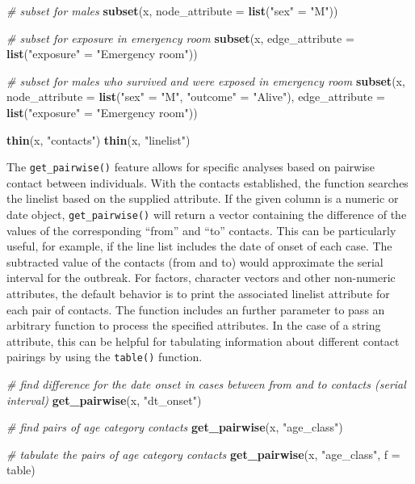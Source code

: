 \documentclass[9pt,a4paper,]{extarticle}
\newenvironment{Shaded}{\begin{snugshade}}{\end{snugshade}}
\newcommand{\KeywordTok}[1]{\textcolor[rgb]{0.13,0.29,0.53}{\textbf{#1}}}
\newcommand{\DataTypeTok}[1]{\textcolor[rgb]{0.13,0.29,0.53}{#1}}
\newcommand{\StringTok}[1]{\textcolor[rgb]{0.31,0.60,0.02}{#1}}
\newcommand{\CommentTok}[1]{\textcolor[rgb]{0.56,0.35,0.01}{\textit{#1}}}
\newcommand{\NormalTok}[1]{#1}
\theoremstyle{definition}
\theoremstyle{definition}
\theoremstyle{definition}
\theoremstyle{remark}
\begin{document}
\begin{Shaded}
\begin{Highlighting}[]
\CommentTok{# subset for males}
\KeywordTok{subset}\NormalTok{(x, }\DataTypeTok{node_attribute =} \KeywordTok{list}\NormalTok{(}\StringTok{"sex"}\NormalTok{ =}\StringTok{ "M"}\NormalTok{))}

\CommentTok{# subset for exposure in emergency room}
\KeywordTok{subset}\NormalTok{(x, }\DataTypeTok{edge_attribute =} \KeywordTok{list}\NormalTok{(}\StringTok{"exposure"}\NormalTok{ =}\StringTok{ "Emergency room"}\NormalTok{))}

\CommentTok{# subset for males who survived and were exposed in emergency room}
\KeywordTok{subset}\NormalTok{(x,}
       \DataTypeTok{node_attribute =} \KeywordTok{list}\NormalTok{(}\StringTok{"sex"}\NormalTok{ =}\StringTok{ "M"}\NormalTok{, }\StringTok{"outcome"}\NormalTok{ =}\StringTok{ "Alive"}\NormalTok{),}
       \DataTypeTok{edge_attribute =} \KeywordTok{list}\NormalTok{(}\StringTok{"exposure"}\NormalTok{ =}\StringTok{ "Emergency room"}\NormalTok{))}

\KeywordTok{thin}\NormalTok{(x, }\StringTok{"contacts"}\NormalTok{)}
\KeywordTok{thin}\NormalTok{(x, }\StringTok{"linelist"}\NormalTok{)  }
\end{Highlighting}
\end{Shaded}

The \texttt{get\_pairwise()} feature allows for specific analyses based on pairwise contact between individuals. With the contacts established, the function searches the linelist based on the supplied attribute. If the given column is a numeric or date object, \texttt{get\_pairwise()} will return a vector containing the difference of the values of the corresponding ``from'' and ``to'' contacts. This can be particularly useful, for example, if the line list includes the date of onset of each case. The subtracted value of the contacts (from and to) would approximate the serial interval for the outbreak\citep{fine:2003}. For factors, character vectors and other non-numeric attributes, the default behavior is to print the associated linelist attribute for each pair of contacts. The function includes an further parameter to pass an arbitrary function to process the specified attributes. In the case of a string attribute, this can be helpful for tabulating information about different contact pairings by using the \texttt{table()} function.

\begin{Shaded}
\begin{Highlighting}[]
\CommentTok{# find difference for the date onset in cases between from and to contacts (serial interval)}
\KeywordTok{get_pairwise}\NormalTok{(x, }\StringTok{"dt_onset"}\NormalTok{)}

\CommentTok{# find pairs of age category contacts}
\KeywordTok{get_pairwise}\NormalTok{(x, }\StringTok{"age_class"}\NormalTok{)}

\CommentTok{# tabulate the pairs of age category contacts}
\KeywordTok{get_pairwise}\NormalTok{(x, }\StringTok{"age_class"}\NormalTok{, }\DataTypeTok{f =}\NormalTok{ table)}
\end{Highlighting}
\end{Shaded}
\end{document}
